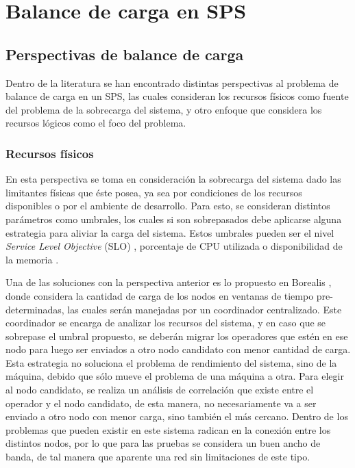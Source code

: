 \chapter{Balance de carga en SPS}
\label{cap:estadoDelArte}

\section{Perspectivas de balance de carga}
\label{sec:perspectivasBC}
Dentro de la literatura se han encontrado distintas perspectivas al problema de balance de carga en un SPS, las cuales consideran los recursos físicos como fuente del problema de la sobrecarga del sistema, y otro enfoque que considera los recursos lógicos como el foco del problema.

\subsection{Recursos físicos}
\label{subsec:recFisicosBC}
En esta perspectiva se toma en consideración la sobrecarga del sistema dado las limitantes físicas que éste posea, ya sea por condiciones de los recursos disponibles o por el ambiente de desarrollo. Para esto, se consideran distintos parámetros como umbrales, los cuales si son sobrepasados debe aplicarse alguna estrategia para aliviar la carga del sistema. Estos umbrales pueden ser el nivel \textit{Service Level Objective} (SLO) \citep{sturm2000foundations}, porcentaje de CPU utilizada o disponibilidad de la memoria \citep{Dong06schedulingalgorithms}.

Una de las soluciones con la perspectiva anterior es lo propuesto en Borealis \citep{XingZH05}, donde considera la cantidad de carga de los nodos en ventanas de tiempo pre-determinadas, las cuales serán manejadas por un coordinador centralizado. Este coordinador se encarga de analizar los recursos del sistema, y en caso que se sobrepase el umbral propuesto, se deberán migrar los operadores que estén en ese nodo para luego ser enviados a otro nodo candidato con menor cantidad de carga. Esta estrategia no soluciona el problema de rendimiento del sistema, sino de la máquina, debido que sólo mueve el problema de una máquina a otra. Para elegir al nodo candidato, se realiza un análisis de correlación que existe entre el operador y el nodo candidato, de esta manera, no necesariamente va a ser enviado a otro nodo con menor carga, sino también el más cercano. Dentro de los problemas que pueden existir en este sistema radican en la conexión entre los distintos nodos, por lo que para las pruebas se considera un buen ancho de banda, de tal manera que aparente una red sin limitaciones de este tipo.


